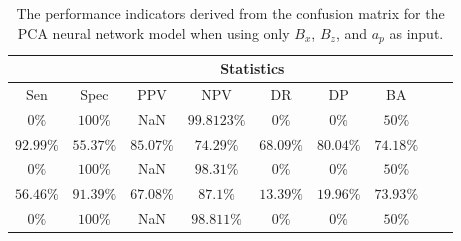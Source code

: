 \begin{table}[!ht]
	\centering
	\begin{tabular}{|c|c|c|c|c|c|c|c|c|}
		\hline
		 & \multicolumn{7}{c|}{Statistics} \\ \hline
		Sen & Spec & PPV & NPV & DR & DP & BA \\ \hline
		$0\%$ & $100\%$ & NaN & $99.8123\%$ & $0\%$ & $0\%$ & $50\%$ \\ \hline
		$92.99\%$ & $55.37\%$ & $85.07\%$ & $74.29\%$ & $68.09\%$ & $80.04\%$ & $74.18\%$ \\ \hline
		$0\%$ & $100\%$ & NaN & $98.31\%$ & $0\%$ & $0\%$ & $50\%$ \\ \hline
		$56.46\%$ & $91.39\%$ & $67.08\%$ & $87.1\%$ & $13.39\%$ & $19.96\%$ & $73.93\%$ \\ \hline
		$0\%$ & $100\%$ & NaN & $98.811\%$ & $0\%$ & $0\%$ & $50\%$ \\ \hline
	\end{tabular}
	\caption{The performance indicators derived from the confusion matrix for the PCA neural network model when using only $B_{x}$, $B_{z}$, and $a_{p}$ as input.}
	\label{tab:cs:xzap:pcaNNet}
\end{table}
